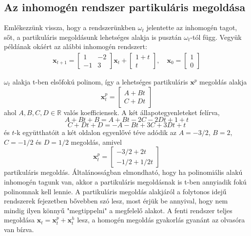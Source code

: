 \documentclass[14p]{article}
\begin{document}
\subsection{Az inhomogén rendszer partikuláris megoldása}
Emlékezzünk vissza, hogy a rendszerünkben $\omega_t$ jelentette az inhomogén tagot, sőt, a partikuláris megoldásunk lehetséges alakja is pusztán $\omega_t$-tól függ.
Vegyük példának okáért az alábbi inhomogén rendszert:
\begin{align*}
	\pmb{x}_{t+1} =
	\begin{bmatrix}
	1 & -2 \\
	-1 & 3
	\end{bmatrix} \pmb{x}_t +
	\begin{bmatrix}
	1 + t \\
	t
	\end{bmatrix}, \quad
	\pmb{x}_0 =
	\begin{bmatrix}
	1 \\
	0
	\end{bmatrix}
\end{align*}

$\omega_t$ alakja t-ben elsőfokú polinom, így a lehetséges partikuláris $\pmb{x}^{p}$ megoldás alakja
\[
	\pmb{x}_{t}^{p} = 
	\begin{bmatrix}
	A + Bt \\
	C + Dt
	\end{bmatrix}
\]
ahol $A, B, C, D \in \mathbb{R}$ valós koefficiensek. A két állapotegyenleteket felírva,
\[
	A + Bt + B = A + Bt - 2C -2Dt + 1 + t
\]
\[
	C + Dt + D = -A - Bt + 3C + 3Dt + t
\]
és $t$-k együtthatóit a két oldalon egyenlővé téve adódik az $A = -3/2$, $B = 2$, $C = -1/2$ és $D = 1/2$ megoldás, amivel
\[
	\pmb{x}_{t}^{p} = 
	\begin{bmatrix}
	-3/2 + 2t \\
	-1/2 + 1/2t
	\end{bmatrix}
\]
partikuláris megoldás. Általánosságban elmondható, hogy ha polinomiális alakú inhomogén tagunk van, akkor a partikuláris megoldásnak is t-ben annyiadik fokú polinomnak kell lennie. A partikuláris megoldás alakjáról a folytonos idejű rendszerek fejezetben bővebben szó lesz, most érjük be annyival, hogy nem mindig ilyen könnyű "megtippelni" a megfelelő alakot. A fenti rendszer teljes megoldása $\pmb{x}_t = \pmb{x}_{t}^{p} + \pmb{x}_{t}^{h}$ lesz, a homogén megoldás gyakorlás gyanánt az olvasóra van bízva.
\end{document}
